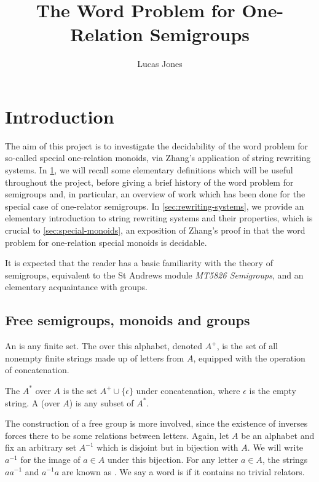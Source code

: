 \documentclass[showlabels,noindex,12pt]{lmaths}
\title{The Word Problem for One-Relation Semigroups}
\author{Lucas Jones}
\begin{document}
\maketitle
\bigskip
\tableofcontents

\section{Introduction} \label{sec:intro}

The aim of this project is to investigate the decidability of the word problem for so-called special one-relation monoids, via Zhang's application of string rewriting systems. In \cref{sec:intro}, we will recall some elementary definitions which will be useful throughout the project, before giving a brief history of the word problem for semigroups and, in particular, an overview of work which has been done for the special case of one-relator semigroups. In \cref{sec:rewriting-systems}, we provide an elementary introduction to string rewriting systems and their properties, which is crucial to \cref{sec:special-monoids}, an exposition of Zhang's proof in \cite{Zhang1992a} that the word problem for one-relation special monoids is decidable.

It is expected that the reader has a basic familiarity with the theory of semigroups, equivalent to the St Andrews module \emph{MT5826 Semigroups}, and an elementary acquaintance with groups.

\subsection{Free semigroups, monoids and groups}

An  is any finite set. The  over this alphabet, denoted $A^{+}$, is the set of all nonempty finite strings made up of letters from $A$, equipped with the operation of concatenation.

The  $A^*$ over $A$ is the set $A^+ \cup \{\epsilon\}$ under concatenation, where $\epsilon$ is the empty string. A  (over $A$) is any subset of $A^*$.

The construction of a free group is more involved, since the existence of inverses forces there to be some relations between letters. Again, let $A$ be an alphabet and fix an arbitrary set $A^{-1}$ which is disjoint but in bijection with $A$. We will write $a^{-1}$ for the image of $a \in A$ under this bijection. For any letter $a \in A$, the strings $aa^{-1}$ and $a^{-1}a$ are known as . We say a word is  if it contains no trivial relators.
\end{document}
